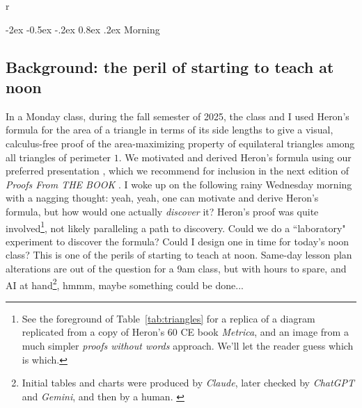 \documentclass[10.5pt]
{amsart}
\makeatletter
\renewcommand{\section}{\@startsection{section}{1}{\z@}%
  {-2ex \@plus -0.5ex \@minus -.2ex}%
  {0.8ex \@plus .2ex}%
  {\normalfont\Large\bfseries}}
\makeatother
\begin{document}
\begin{table}[24]{r}


\end{table}



\section{Morning}

\subsection{Background: the peril of starting to teach at noon} 

In a Monday class, during the fall semester of 2025, the class and I used Heron's formula for the area of a triangle in terms of its side lengths to give a visual, calculus-free proof of the area-maximizing property of equilateral triangles among all triangles of perimeter $1$. We motivated and derived Heron's formula using our preferred presentation \cite{klain-2004}, which we recommend for inclusion in the next edition of \emph{Proofs From THE BOOK} \cite{proofs_from_z_book-2018}. I woke up on the following rainy Wednesday morning with a nagging thought: yeah, yeah, one can motivate and derive Heron's formula, but how would one actually \emph{discover} it? Heron's proof was quite involved\footnote{See the foreground of Table~\ref{tab:triangles} for a replica of a diagram replicated from a copy of Heron's 60 CE book \emph{Metrica}\cite{bruins-1964}, and an image from a much simpler \emph{proofs without words} approach\cite{nelsen-2001}. We'll let the reader guess which is which.}, not likely paralleling a path to discovery. Could we do a ``laboratory" experiment to discover the formula? Could I design one in time for today's noon class? This is one of the perils of starting to teach at noon. Same-day lesson plan alterations are out of the question for a 9am class, but with hours to spare, and AI at hand\footnote{Initial tables and charts were produced by \emph{Claude}, later checked by \emph{ChatGPT} and \emph{Gemini}, and then by a human. \label{fn:whichAI}}, hmmm, maybe something could be done...
\end{document}
